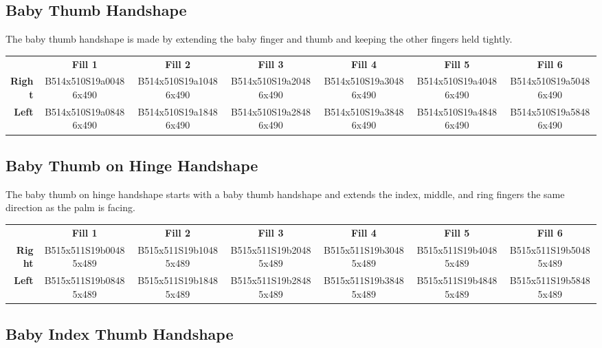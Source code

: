 \documentclass{article}
\begin{document}
\subsection{Baby Thumb Handshape}

The baby thumb handshape is made by extending the baby finger and thumb and keeping the other fingers held tightly.

\begin{center}
\begin{tabular}{r*{6}{c}}
&\textbf{Fill 1}&\textbf{Fill 2}&\textbf{Fill 3}&\textbf{Fill 4}&\textbf{Fill 5}&\textbf{Fill 6}\\
\textbf{Right}&
B514x510S19a00486x490&
B514x510S19a10486x490&
B514x510S19a20486x490&
B514x510S19a30486x490&
B514x510S19a40486x490&
B514x510S19a50486x490\\
\textbf{Left}&
B514x510S19a08486x490&
B514x510S19a18486x490&
B514x510S19a28486x490&
B514x510S19a38486x490&
B514x510S19a48486x490&
B514x510S19a58486x490\\
\end{tabular}
\end{center}

\subsection{Baby Thumb on Hinge Handshape}

The baby thumb on hinge handshape starts with a baby thumb handshape and extends the index, middle, and ring fingers the same direction as the palm is facing.

\begin{center}
\begin{tabular}{r*{6}{c}}
&\textbf{Fill 1}&\textbf{Fill 2}&\textbf{Fill 3}&\textbf{Fill 4}&\textbf{Fill 5}&\textbf{Fill 6}\\
\textbf{Right}&
B515x511S19b00485x489&
B515x511S19b10485x489&
B515x511S19b20485x489&
B515x511S19b30485x489&
B515x511S19b40485x489&
B515x511S19b50485x489\\
\textbf{Left}&
B515x511S19b08485x489&
B515x511S19b18485x489&
B515x511S19b28485x489&
B515x511S19b38485x489&
B515x511S19b48485x489&
B515x511S19b58485x489\\
\end{tabular}
\end{center}

\subsection{Baby Index Thumb Handshape}
\end{document}
